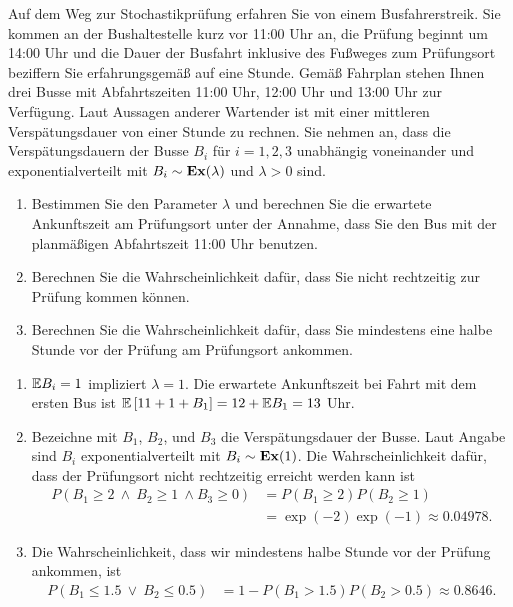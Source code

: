  Auf dem Weg zur Stochastikprüfung erfahren Sie von
einem Busfahrerstreik. Sie kommen an der Bushaltestelle kurz vor 11:00 Uhr an,
die Prüfung beginnt um 14:00 Uhr und die Dauer der Busfahrt inklusive des
Fußweges zum Prüfungsort beziffern Sie erfahrungsgemäß auf eine Stunde. Gemäß
Fahrplan stehen Ihnen drei Busse mit Abfahrtszeiten 11:00 Uhr, 12:00 Uhr und 13:00 Uhr zur
Verfügung. Laut Aussagen anderer Wartender ist mit einer mittleren
Verspätungsdauer von einer Stunde zu rechnen. Sie nehmen an, dass die
Verspätungsdauern der Busse $B_i$  f\"ur $i=1,2,3$ unabhängig voneinander und exponentialverteilt mit $B_i \sim \mathbf{Ex}(\lambda)$ und
$\lambda>0$ sind. 
\begin{enumerate}
    \item Bestimmen Sie den Parameter $\lambda$ und berechnen Sie die erwartete
        Ankunftszeit am Prüfungsort unter der Annahme, dass Sie den Bus mit der
        planmäßigen Abfahrtszeit 11:00 Uhr benutzen.
    \item Berechnen Sie die Wahrscheinlichkeit dafür, dass Sie nicht rechtzeitig 
        zur Prüfung kommen können.
    \item Berechnen Sie die Wahrscheinlichkeit dafür, dass Sie mindestens eine halbe Stunde
        vor der Prüfung am Prüfungsort ankommen.
\end{enumerate}

\solution
\begin{enumerate}
    \item $\mathbb{E} B_i = 1$ impliziert $\lambda=1$. Die erwartete Ankunftszeit bei
        Fahrt mit dem ersten Bus ist $\mathbb{E} \left[ 11 + 1 + B_1  \right] = 12 +
        \mathbb{E} B_1 = 13$ Uhr.
    \item Bezeichne mit $B_1$, $B_2$, und $B_3$ die Verspätungsdauer der Busse.
        Laut Angabe sind $B_i$ exponentialverteilt mit  $B_i \sim
        \mathbf{Ex}(1)$. Die Wahrscheinlichkeit dafür, dass der Prüfungsort nicht
        rechtzeitig erreicht werden kann ist
        \begin{align*}
            P\left( B_1 \geq 2 \ \wedge \ B_2 \geq 1 \ \wedge B_3 \geq 0 \right) &= 
            P(B_1 \geq 2) P(B_2 \geq 1) \\
            &= \exp\left( -2 \right) \exp( -1) \approx 0.04978.
        \end{align*}

    \item Die Wahrscheinlichkeit, dass wir mindestens halbe Stunde vor der
        Prüfung ankommen, ist
        \begin{align*}
            P( B_1 \leq 1.5 \ \vee \ B_2 \leq 0.5  ) &= 1 - P(B_1 > 1.5 )P(B_2 > 0.5) 
            \approx 0.8646. 
        \end{align*}
\end{enumerate}


